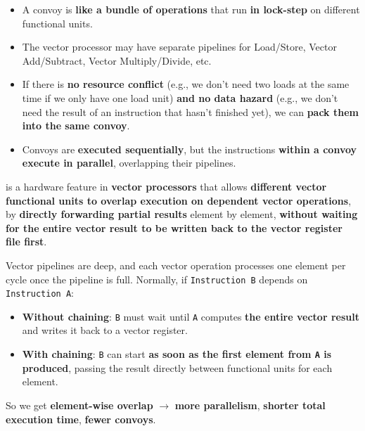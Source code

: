 \begin{enumerate}
    \begin{itemize}
        \item A convoy is \textbf{like a bundle of operations} that run \textbf{in lock-step} on different functional units.
        \item The vector processor may have separate pipelines for Load/Store, Vector Add/Subtract, Vector Multiply/Divide, etc.
        \item If there is \textbf{no resource conflict} (e.g., we don't need two loads at the same time if we only have one load unit) \textbf{and no data hazard} (e.g., we don't need the result of an instruction that hasn't finished yet), we can \textbf{pack them into the same convoy}.
        \item Convoys are \textbf{executed sequentially}, but the instructions \textbf{within a convoy execute in parallel}, overlapping their pipelines.
    \end{itemize}

    \newpage

     is a hardware feature in \textbf{vector processors} that allows \textbf{different vector functional units to overlap execution on dependent vector operations}, by \textbf{directly forwarding partial results} element by element, \textbf{without waiting for the entire vector result to be written back to the vector register file first}.

    Vector pipelines are deep, and each vector operation processes one element per cycle once the pipeline is full. Normally, if \texttt{Instruction B} depends on \texttt{Instruction A}:
    \begin{itemize}
        \item \textbf{Without chaining}: \texttt{B} must wait until \texttt{A} computes \textbf{the entire vector result} and writes it back to a vector register.
        \item \textbf{With chaining}: \texttt{B} can start \textbf{as soon as the first element from \texttt{A} is produced}, passing the result directly between functional units for each element.
    \end{itemize}
    So we get \textbf{element-wise overlap} $\rightarrow$ \textbf{more parallelism}, \textbf{shorter total execution time}, \textbf{fewer convoys}.



\end{enumerate}
